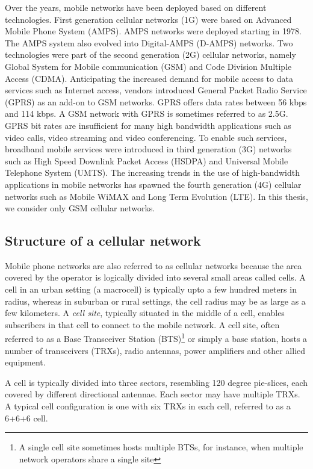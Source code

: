 Over the years, mobile networks have been deployed based on different technologies. First generation cellular networks (1G) were based on Advanced Mobile Phone System (AMPS). AMPS networks were deployed starting in 1978. The AMPS system also evolved into Digital-AMPS (D-AMPS) networks. Two technologies were part of the second generation (2G) cellular networks, namely Global System for Mobile communication (GSM) and Code Division Multiple Access (CDMA). Anticipating the increased demand for mobile access to data services such as Internet access, vendors introduced General Packet Radio Service (GPRS) as an add-on to GSM networks. GPRS offers data rates between 56 kbps and 114 kbps. A GSM network with GPRS is sometimes referred to as 2.5G. GPRS bit rates are insufficient for many high bandwidth applications such as video calls, video streaming and video conferencing. To enable such services, broadband mobile services were introduced in third generation (3G) networks such as High Speed Downlink Packet Access (HSDPA) and Universal Mobile Telephone System (UMTS). The increasing trends in the use of high-bandwidth applications in mobile networks has spawned the fourth generation (4G) cellular networks such as Mobile WiMAX and Long Term Evolution (LTE). In this thesis, we consider only GSM cellular networks.

\subsection{Structure of a cellular network} %
Mobile phone networks are also referred to as cellular networks because the area covered by the operator is logically divided into several small areas called cells. A cell in an urban setting (a macrocell) is typically upto a few hundred meters in radius, whereas in suburban or rural settings, the cell radius may be as large as a few kilometers. A \textit{cell site}, typically situated in the middle of a cell, enables subscribers in that cell to connect to the mobile network. A cell site, often referred to as a Base Transceiver Station (BTS)\footnote{A single cell site sometimes hosts multiple BTSs, for instance, when multiple network operators share a single site} or simply a base station, hosts a number of transceivers (TRXs), radio antennas, power amplifiers and other allied equipment. 

A cell is typically divided into three sectors, resembling 120 degree pie-slices, each covered by different directional antennae. Each sector may have multiple TRXs. A typical cell configuration is one with six TRXs in each cell, referred to as a 6+6+6 cell. 

